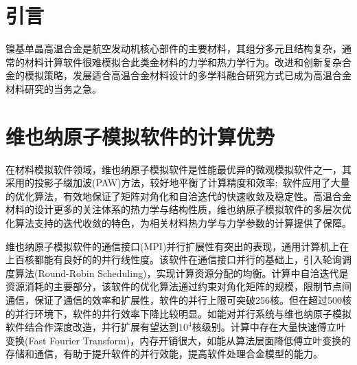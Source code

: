 \section{引言}
镍基单晶高温合金是航空发动机核心部件的主要材料，其组分多元且结构复杂，通常的材料计算软件很难模拟合此类金材料的力学和热力学行为。改进和创新复杂合金的模拟策略，发展适合高温合金材料设计的多学科融合研究方式已成为高温合金材料研究的当务之急。

\section{维也纳原子模拟软件的计算优势}
在材料模拟软件领域，维也纳原子模拟软件是性能最优异的微观模拟软件之一，其采用的投影子缀加波\textrm{(PAW)}方法，较好地平衡了计算精度和效率;~软件应用了大量的优化算法，有效地保证了矩阵对角化和自洽迭代的快速收敛及稳定性。高温合金材料的设计更多的关注体系的热力学与结构性质，维也纳原子模拟软件的多层次优化算法支持的迭代收敛的特色，为相关材料热力学与力学参数的计算提供了保障。%

维也纳原子模拟软件的通信接口(\textrm{MPI})并行扩展性有突出的表现，通用计算机上在上百核都能有良好的的并行线性度。该软件在通信接口并行的基础上，引入轮询调度算法\textrm{(Round-Robin Scheduling)}，实现计算资源分配的均衡。计算中自洽迭代是资源消耗的主要部分，该软件的优化算法通过约束对角化矩阵的规模，限制节点间通信，保证了通信的效率和扩展性，软件的并行上限可突破256核。但在超过500核的并行环境下，软件的并行效率下降比较明显。如能对并行系统与维也纳原子模拟软件结合作深度改造，并行扩展有望达到$10^4$核级别。计算中存在大量快速傅立叶变换(\textrm{Fast Fourier Transform})，内存开销很大，如能从算法层面降低傅立叶变换的存储和通信，有助于提升软件的并行效能，提高软件处理合金模型的能力。

